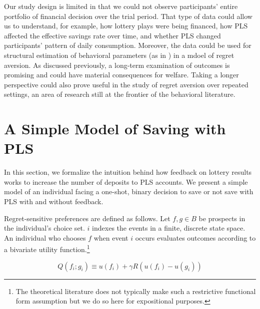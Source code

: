 \documentclass[12pt]{article}
\begin{document}
	Our study design is limited in that we could not observe participants' entire portfolio of financial decision over the trial period. That type of data could allow us to understand, for example, how lottery plays were being financed, how PLS affected the effective savings rate over time, and whether PLS changed participants' pattern of daily consumption. Moreover, the data could be used for structural estimation of behavioral parameters (as in \textcite{filiz-ozbay_lottery_2015}) in a mdoel of regret aversion. As discussed previously, a long-term examination of outcomes is promising and could have material consequences for welfare. Taking a longer perspective could also prove useful in the study of regret aversion over repeated settings, an area of research still at the frontier of the behavioral literature.

	\clearpage

\newpage

\printbibliography

\newpage

\appendix

\section{A Simple Model of Saving with PLS} \label{sec:model}

	In this section, we formalize the intuition behind how feedback on lottery results works to increase the number of deposits to PLS accounts. We present a simple model of an individual facing a one-shot, binary decision to save or not save with PLS with and without feedback.



	Regret-sensitive preferences are defined as follows. Let $f, g \in B$ be prospects in the individual's choice set. $i$ indexes the events in a finite, discrete state space. An individual who chooses $f$ when event $i$ occurs evaluates outcomes according to a bivariate utility function.\footnote{The theoretical literature does not typically make such a restrictive functional form assumption but we do so here for expositional purposes.}

		\[ Q(f_i; g_i) \equiv u(f_i) + \gamma R(u(f_i) - u(g_i)) \]
\end{document}
